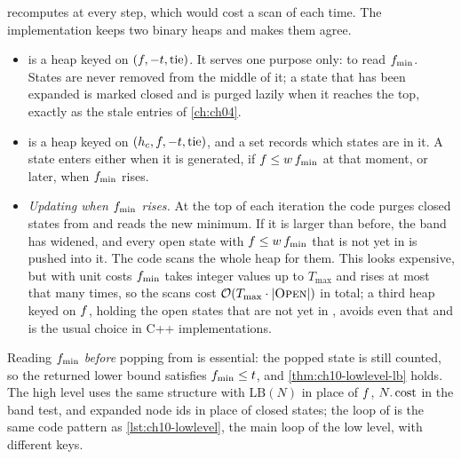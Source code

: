  recomputes \Focal at every step, which would cost
a scan of \Open each time. The implementation keeps two binary heaps and makes
them agree.
\begin{itemize}
  \item \Open is a heap keyed on $(f, -t, \text{tie})$. It serves one
        purpose only: to read $f_{\min}$. States are never removed from
        the middle of it; a state that has been expanded is marked closed and
        is purged lazily when it reaches the top, exactly as the stale entries
        of \cref{ch:ch04}.
  \item \Focal is a heap keyed on $(h_c, f, -t, \text{tie})$, and a set
         records which states are in it. A state enters \Focal
        either when it is generated, if $f \le w\,f_{\min}$ at that
        moment, or later, when $f_{\min}$ rises.
  \item \emph{Updating \Focal when $f_{\min}$ rises.} At the top of each
        iteration the code purges closed states from \Open and reads the new
        minimum. If it is larger than before, the band has widened, and every
        open state with $f \le w\,f_{\min}$ that is not yet in
        \Focal is pushed into it. The code scans the whole \Open heap for
        them. This looks expensive, but with unit costs $f_{\min}$ takes
        integer values up to $T_{\max}$ and rises at most that many times, so
        the scans cost $\mathcal{O}\!\left(T_{\max} \cdot \left\lvert \textsc{Open} \right\rvert\right)$ in total; a third
        heap keyed on $f$, holding the open states that are not yet in
        \Focal, avoids even that and is the usual choice in C++
        implementations.
\end{itemize}
Reading $f_{\min}$ \emph{before} popping from \Focal is essential: the
popped state is still counted, so the returned lower bound satisfies
$f_{\min} \le t$, and \cref{thm:ch10-lowlevel-lb} holds. The high level
uses the same structure with $\mathrm{LB}(N)$ in place of $f$, $N.\operatorname{cost}$
in the band test, and expanded node ids in place of closed states; the loop of
 is the same code pattern as \cref{lst:ch10-lowlevel}, the main
loop of the low level, with different keys.


